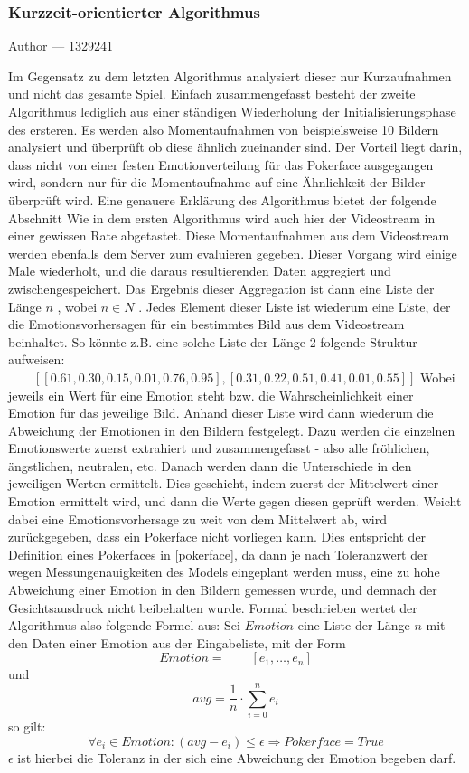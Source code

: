 \documentclass[12pt, a4paper]{report}
\makeatletter
\newcommand{\sectionauthor}[1]{%
  {\parindent0pt\vspace*{-5pt}%
  \large{Author --- }
  \linespread{1.1}\large\scshape#1%
  \par\nobreak\vspace*{35pt} }
  \@afterheading%
}
\makeatother
\begin{document}
\subsubsection{Kurzzeit-orientierter Algorithmus}
\sectionauthor{1329241}
Im Gegensatz zu dem letzten Algorithmus analysiert dieser nur Kurzaufnahmen und nicht das gesamte Spiel. Einfach zusammengefasst besteht der zweite Algorithmus lediglich aus einer ständigen Wiederholung der Initialisierungsphase des ersteren. Es werden also Momentaufnahmen von beispielsweise 10 Bildern analysiert und überprüft ob diese ähnlich zueinander sind. Der Vorteil liegt darin, dass nicht von einer festen Emotionverteilung für das Pokerface ausgegangen wird, sondern nur für die Momentaufnahme auf eine Ähnlichkeit der Bilder überprüft wird. Eine genauere Erklärung des Algorithmus bietet der folgende Abschnitt
\newline
Wie in dem ersten Algorithmus wird auch hier der Videostream in einer gewissen Rate abgetastet. Diese Momentaufnahmen aus dem Videostream werden ebenfalls dem Server zum evaluieren gegeben. Dieser Vorgang wird einige Male wiederholt, und die daraus resultierenden Daten aggregiert und zwischengespeichert. Das Ergebnis dieser Aggregation ist dann eine Liste der Länge 
$ n $  , wobei $ n \in N $
. Jedes Element dieser Liste ist wiederum eine Liste, der die Emotionsvorhersagen für ein bestimmtes Bild aus dem Videostream beinhaltet. So könnte z.B. eine solche Liste der Länge 2 folgende Struktur aufweisen: \newline
$ \qquad[ [0.61, 0.30, 0.15, 0.01, 0.76, 0.95] , [0.31, 0.22, 0.51, 0.41, 0.01, 0.55] ] $
Wobei jeweils ein Wert für eine Emotion steht bzw. die Wahrscheinlichkeit einer Emotion für das jeweilige Bild. Anhand dieser Liste wird dann wiederum die Abweichung der Emotionen in den Bildern festgelegt. Dazu werden die einzelnen Emotionswerte zuerst extrahiert und zusammengefasst - also alle fröhlichen, ängstlichen, neutralen, etc. Danach werden dann die Unterschiede in den jeweiligen Werten ermittelt.
Dies geschieht, indem zuerst der Mittelwert einer Emotion ermittelt wird, und dann die Werte gegen diesen geprüft werden. Weicht dabei eine Emotionsvorhersage zu weit von dem Mittelwert ab, wird zurückgegeben, dass ein Pokerface nicht vorliegen kann. Dies entspricht der Definition eines Pokerfaces in \ref{pokerface}, da dann je nach Toleranzwert der  wegen Messungenauigkeiten des Models eingeplant werden muss, eine zu hohe Abweichung einer Emotion in den Bildern gemessen wurde, und demnach der Gesichtsausdruck nicht beibehalten wurde.
Formal beschrieben wertet der Algorithmus also folgende Formel aus: \newline
Sei $ Emotion $ eine Liste der Länge $ n $ mit den Daten einer Emotion aus der Eingabeliste, mit der Form $$ Emotion = \qquad [e_{1}, \dots ,e_{n}] $$ 
und 
$$avg =\frac{1}{n} \cdot \sum_{i = 0}^{n} e_{i} $$
 so gilt:
\newline $$ \forall e_{i} \in Emotion : (avg - e_{i} ) \leq \epsilon \Rightarrow Pokerface = True $$
 $ \epsilon$ ist hierbei die Toleranz in der sich eine Abweichung der Emotion begeben darf.
\end{document}

